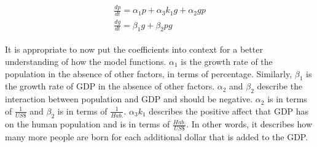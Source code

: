 \documentclass{article}
\begin{document}
\begin{align}
\begin{split}
\label{eq:lvfin}
	\frac{dp}{dt} = \alpha_1 p + \alpha_3 k_1 g + \alpha_2 g p \\
	\frac{dg}{dt} = \beta_1 g + \beta_2 p g
\end{split}
\end{align}

It is appropriate to now put the coefficients into context for a better understanding of how the model functions. $\alpha_1$ is the growth rate of the population in the absence of other factors, in terms of percentage. Similarly, $\beta_1$ is the growth rate of GDP in the absence of other factors. $\alpha_2$ and $\beta_2$ describe the interaction between population and GDP and should be negative. $\alpha_2$ is in terms of $\frac{1}{US\$}$ and $\beta_2$ is in terms of $\frac{1}{Hab.}$. $\alpha_3 k_1$ describes the positive affect that GDP has on the human population and is in terms of $\frac{Hab.}{US\$}$. In other words, it describes how many more people are born for each additional dollar that is added to the GDP. 


\newpage

\nocite{*}


\end{document}
